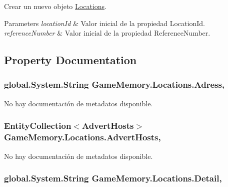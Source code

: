 Crear un nuevo objeto \hyperlink{class_game_memory_1_1_locations}{Locations}. 


\begin{DoxyParams}{Parameters}
{\em location\-Id} & Valor inicial de la propiedad Location\-Id.\\
\hline
{\em reference\-Number} & Valor inicial de la propiedad Reference\-Number.\\
\hline
\end{DoxyParams}


\subsection{Property Documentation}
\hypertarget{class_game_memory_1_1_locations_a03b9430eb5232aa3555f117bc4b2bdca}{
\subsubsection[{Adress}]{\setlength{\rightskip}{0pt plus 5cm}global.\-System.\-String Game\-Memory.\-Locations.\-Adress\hspace{0.3cm}{\ttfamily [get]}, {\ttfamily [set]}}}\label{class_game_memory_1_1_locations_a03b9430eb5232aa3555f117bc4b2bdca}


No hay documentación de metadatos disponible. 

\hypertarget{class_game_memory_1_1_locations_a34dae26338430d0e0f1e394dcd06c502}{
\subsubsection[{Advert\-Hosts}]{\setlength{\rightskip}{0pt plus 5cm}Entity\-Collection$<${\bf Advert\-Hosts}$>$ Game\-Memory.\-Locations.\-Advert\-Hosts\hspace{0.3cm}{\ttfamily [get]}, {\ttfamily [set]}}}\label{class_game_memory_1_1_locations_a34dae26338430d0e0f1e394dcd06c502}


No hay documentación de metadatos disponible. 

\hypertarget{class_game_memory_1_1_locations_a6c2715b80d375ead97d530deb4f20f87}{
\subsubsection[{Detail}]{\setlength{\rightskip}{0pt plus 5cm}global.\-System.\-String Game\-Memory.\-Locations.\-Detail\hspace{0.3cm}{\ttfamily [get]}, {\ttfamily [set]}}}\label{class_game_memory_1_1_locations_a6c2715b80d375ead97d530deb4f20f87}


